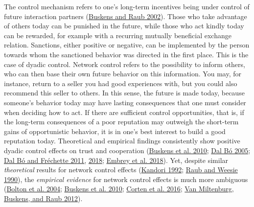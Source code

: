 \documentclass[
  11pt,
]{article}
\begin{document}
The control mechanism refers to one's long-term incentives being under control of future interaction partners (\protect\hyperlink{ref-buskens_raub_embedded_2002}{Buskens and Raub 2002}).
Those who take advantage of others today can be punished in the future, while those who act kindly today can be rewarded, for example with a recurring mutually beneficial exchange relation.
Sanctions, either positive or negative, can be implemented by the person towards whom the sanctioned behavior was directed in the first place.
This is the case of dyadic control.
Network control refers to the possibility to inform others, who can then base their own future behavior on this information.
You may, for instance, return to a seller you had good experiences with, but you could also recommend this seller to others.
In this sense, the future is made today, because someone's behavior today may have lasting consequences that one must consider when deciding how to act.
If there are sufficient control opportunities, that is, if the long-term consequences of a poor reputation may outweigh the short-term gains of opportunistic behavior, it is in one's best interest to build a good reputation today.
Theoretical and empirical findings consistently show positive dyadic control effects on trust and cooperation (\protect\hyperlink{ref-buskens_raub_veer_triads_2010}{Buskens et al. 2010}; \protect\hyperlink{ref-dal_buxf3_cooperation_2005}{Dal Bó 2005}; \protect\hyperlink{ref-dal_buxf3_fruxe9chette_evolution_2011}{Dal Bó and Fréchette 2011}, \protect\hyperlink{ref-dal_buxf3_fruxe9chette_determinants_2018}{2018}; \protect\hyperlink{ref-embrey_etal_cooperation_2018}{Embrey et al. 2018}).
Yet, despite similar \emph{theoretical} results for network control effects (\protect\hyperlink{ref-kandori_social_1992}{Kandori 1992}; \protect\hyperlink{ref-raub_weesie_reputation_1990}{Raub and Weesie 1990}), the \emph{empirical evidence} for network control effects is much more ambiguous (\protect\hyperlink{ref-bolton_electronic_2004}{Bolton et al. 2004}; \protect\hyperlink{ref-buskens_raub_veer_triads_2010}{Buskens et al. 2010}; \protect\hyperlink{ref-corten_etal_reputation_2016}{Corten et al. 2016}; \protect\hyperlink{ref-miltenburg_buskens_triads_2012}{Van Miltenburg, Buskens, and Raub 2012}).
\end{document}
